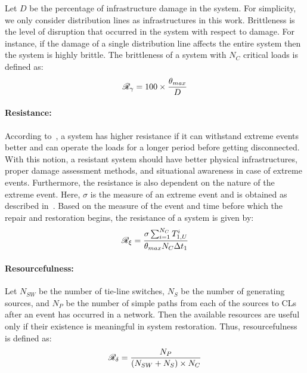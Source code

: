 Let $D$ be the percentage of infrastructure damage in the system. For simplicity, we only consider distribution lines as infrastructures in this work. Brittleness is the level of disruption that occurred in the system with respect to damage. For instance, if the damage of a single distribution line affects the entire system then the system is highly brittle. The brittleness of a system with $N_C$ critical loads is defined as:
\vspace{-3pt}
\begin{equation} \small
    \mathcal{R}_\gamma = 100 \times \frac{\theta_{max}}{D}
    \label{eq:brittleness}
\end{equation}

\paragraph*{Resistance:}

According to~\cite{2016}, a system has higher resistance if it can withstand extreme events better and can operate the loads for a longer period before getting disconnected. With this notion, a resistant system should have better physical infrastructures, proper damage assessment methods, and situational awareness in case of extreme events. Furthermore, the resistance is also dependent on the nature of the extreme event. Here, $\sigma$ is the measure of an extreme event and is obtained as described in~\cite{2016}. Based on the measure of the event and time before which the repair and restoration begins, the resistance of a system is given by:
\vspace{-3pt}
\begin{equation} \small
    \mathcal{R}_\xi = \frac{\sigma \sum_{i=1}^{N_C} T_{1,U}^i}{\theta_{max} N_C \Delta t_1}
    \label{eq:resistance}
\end{equation}

\paragraph*{Resourcefulness:}

Let $N_{SW}$ be the number of tie-line switches, $N_S$ be the number of generating sources, and $N_P$ be the number of simple paths from each of the sources to CLs after an event has occurred in a network. Then the available resources are useful only if their existence is meaningful in system restoration. Thus, resourcefulness is defined as:
\vspace{-3pt}
\begin{equation} \small
    \mathcal{R}_\delta = \frac{N_P}{(N_{SW} + N_S) \times N_C}
    \label{eq:resourcefulness}
\end{equation}

